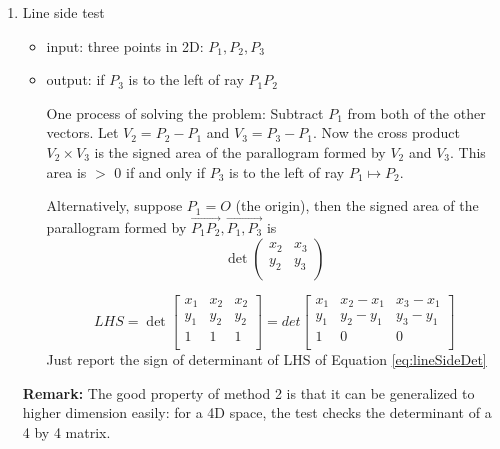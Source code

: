 \documentclass[12pt]{article}
\newcommand{\eref}[1]{Equation \ref{#1}}
\newcommand{\rmk}[1]{\par {\bf Remark: }{#1}}
\begin{document}
\begin{enumerate}[1)]
    \rmk{The good practice is make this line segment intersection test
      be a sum-routine and call an existing solver to solve the
      matrix. Don't try to inline the code}
    
    Some cases when the algorithm output False:
    \begin{itemize}
    \item $L_1$ and $L_2$ parallel but not collinear
    \item the intersection is on the extension of the two line segment
    \item the intersection is on one line segment and on the extension
      of the other.
    \end{itemize}

\item Line side test
  \begin{itemize}
  \item input: three points in 2D: $P_1, P_2, P_3$
  \item output: if $P_3$ is to the left of ray ${P_1P_2}$ 

    One process of solving the problem: Subtract $P_1$ from both of the
    other vectors.  Let $V_2 = P_2-P_1$ and $V_3 = P_3-P_1$.  Now the
    cross product $V_2 \times V_3$ is the signed area of the
    parallogram formed by $V_2$ and $V_3$.  This area is $>$ 0 if and
    only if $P_3$ is to the left of ray $P_1 \mapsto P_2$.
    
    Alternatively, suppose $P_1 = O$ (the origin), then the signed
    area of the parallogram formed by $\vec{P_1 P_2}, \vec{P_1, P_3}$
    is 
    \begin{equation}\label{eq:signArea}
      \det\begin{pmatrix}
        x_2 & x_3 \\
        y_2 & y_3 \\
      \end{pmatrix}
    \end{equation}

    \begin{equation}\label{eq:lineSideDet}
      LHS = \det\begin{bmatrix}
        x_1 & x_2 & x_2\\
        y_1 & y_2 & y_2\\
        1 & 1 & 1\\
      \end{bmatrix}
      =
      det\begin{bmatrix}
        x_1 & x_2 - x_1 & x_3 - x_1\\
        y_1 & y_2 - y_1 & y_3 - y_1\\
        1 & 0 & 0\\
        \end{bmatrix}
    \end{equation}
    Just report the sign of determinant of LHS of
    \eref{eq:lineSideDet}
  \end{itemize}
  \rmk{The good property of method 2 is that it can be generalized to
    higher dimension easily: for a 4D space, the test checks the
    determinant of a 4 by 4 matrix.}


\end{enumerate}
\end{document}
